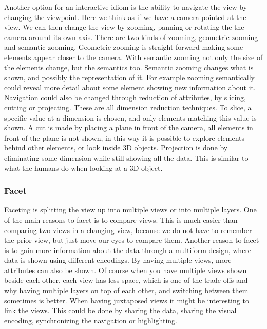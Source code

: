 \documentclass[Report.tex]{subfiles}
\begin{document}
Another option for an interactive idiom is the ability to navigate the view by changing the viewpoint. Here we think as if we have a camera pointed at the view. We can then change the view by zooming, panning or rotating the the camera around its own axis. There are two kinds of zooming, geometric zooming and semantic zooming. Geometric zooming is straight forward making some elements appear closer to the camera. With semantic zooming not only the size of the elements change, but the semantics too. Semantic zooming changes what is shown, and possibly the representation of it. For example zooming semantically could reveal more detail about some element showing new information about it.
Navigation could also be changed through reduction of attributes, by slicing, cutting or projecting. These are all dimension reduction techniques. To slice, a specific value at a dimension is chosen, and only elements matching this value is shown. A cut is made by placing a plane in front of the camera, all elements in front of the plane is not shown, in this way it is possible to explore elements behind other elements, or look inside 3D objects. Projection is done by eliminating some dimension while still showing all the data. This is similar to what the humans do when looking at a 3D object.
\subsubsection{Facet}
Faceting is splitting the view up into multiple views or into multiple layers. One of the main reasons to facet is to compare views. This is much easier than comparing two views in a changing view, because we do not have to remember the prior view, but just move our eyes to compare them. Another reason to facet is to gain more information about the data through a multiform design, where data is shown using different encodings. By having multiple views, more attributes can also be shown. Of course when you have multiple views shown beside each other, each view has less space, which is one of the trade-offs and why having multiple layers on top of each other, and switching between them sometimes is better. When having juxtaposed views it might be interesting to link the views.  This could be done by sharing the data, sharing the visual encoding, synchronizing the navigation or highlighting. 
\end{document}
